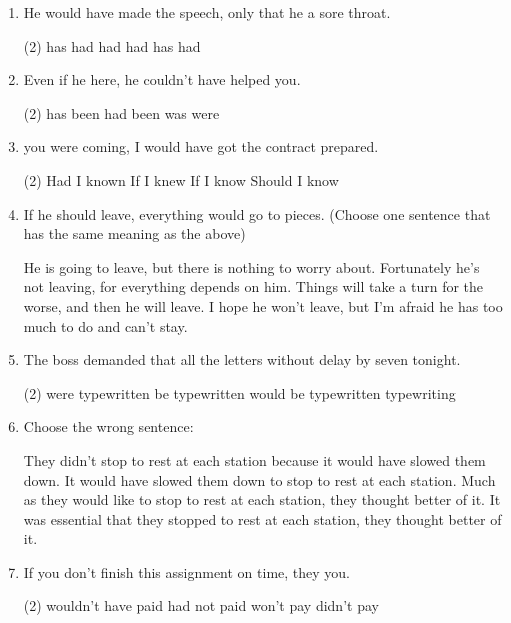 \begin{enumerate}
\item He would have made the speech, only that he \ttu a sore throat.
  \begin{tasks}(2)
    \task has
    \task had
    \task had had
    \task has had
  \end{tasks}

\item Even if he \ttu here, he couldn't have helped you.
  \begin{tasks}(2)
    \task has been
    \task had been
    \task was
    \task were
  \end{tasks}

\item \ttu you were coming, I would have got the contract prepared.
  \begin{tasks}(2)
    \task Had I known
    \task If I knew
    \task If I know
    \task Should I know
  \end{tasks}

\item If he should leave, everything would go to pieces. (Choose one sentence that has the same meaning as the above)
  \begin{tasks}
    \task He is going to leave, but there is nothing to worry about.
    \task Fortunately he's not leaving, for everything depends on him.
    \task Things will take a turn for the worse, and then he will leave.
    \task I hope he won't leave, but I'm afraid he has too much to do and can't stay.
  \end{tasks}

\item The boss demanded that all the letters \ttu without delay by seven tonight.
  \begin{tasks}(2)
    \task were typewritten
    \task be typewritten
    \task would be typewritten
    \task typewriting
  \end{tasks}

\item Choose the wrong sentence:
  \begin{tasks}
    \task They didn't stop to rest at each station because it would have slowed them down.
    \task It would have slowed them down to stop to rest at each station.
    \task Much as they would like to stop to rest at each station, they thought better of it.
    \task It was essential that they stopped to rest at each station, they thought better of it.
  \end{tasks}

\item If you don't finish this assignment on time, they \ttu you.
  \begin{tasks}(2)
    \task wouldn't have paid
    \task had not paid
    \task won't pay
    \task didn't pay
  \end{tasks}


\end{enumerate}
